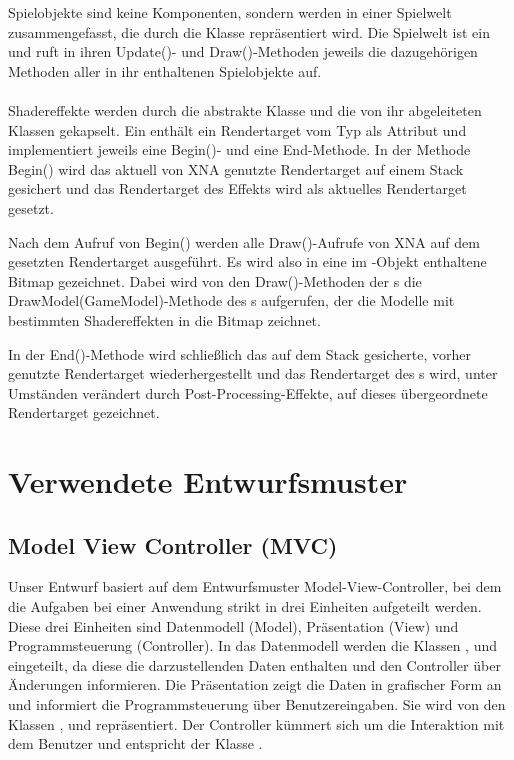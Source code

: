 Spielobjekte sind keine Komponenten, sondern werden in einer Spielwelt zusammengefasst, die durch die Klasse  repräsentiert wird. Die Spielwelt ist ein  und ruft in ihren Update()- und Draw()-Methoden jeweils die dazugehörigen Methoden aller in ihr enthaltenen Spielobjekte auf.
\\\\
Shadereffekte werden durch die abstrakte Klasse  und die von ihr abgeleiteten Klassen gekapselt. Ein  enthält ein Rendertarget vom Typ  als Attribut und implementiert jeweils eine Begin()- und eine End-Methode. In der Methode Begin() wird das aktuell von XNA genutzte Rendertarget auf einem Stack gesichert und das Rendertarget des Effekts wird als aktuelles Rendertarget gesetzt.

Nach dem Aufruf von Begin() werden alle Draw()-Aufrufe von XNA auf dem gesetzten Rendertarget ausgeführt. Es wird also in eine im -Objekt enthaltene Bitmap gezeichnet. Dabei wird von den Draw()-Methoden der s die DrawModel(GameModel)-Methode des s aufgerufen, der die Modelle mit bestimmten Shadereffekten in die Bitmap zeichnet.

In der End()-Methode wird schließlich das auf dem Stack gesicherte, vorher genutzte Rendertarget wiederhergestellt und das Rendertarget des s wird, unter Umständen verändert durch Post-Processing-Effekte, auf dieses übergeordnete Rendertarget gezeichnet.


\section{Verwendete Entwurfsmuster}

\subsection{Model View Controller (MVC)}
Unser Entwurf basiert auf dem Entwurfsmuster Model-View-Controller, bei dem die Aufgaben bei einer Anwendung strikt in drei Einheiten aufgeteilt werden. Diese drei Einheiten sind  Datenmodell (Model), Präsentation (View) und Programmsteuerung (Controller).
\newline
\newline
In das Datenmodell werden die Klassen ,  und  eingeteilt, da diese die darzustellenden Daten enthalten und den Controller über Änderungen informieren. Die Präsentation zeigt die Daten in grafischer Form an und informiert die Programmsteuerung über Benutzereingaben. Sie wird von den Klassen ,  und  repräsentiert.
Der Controller kümmert sich um die Interaktion mit dem Benutzer und entspricht der Klasse .


